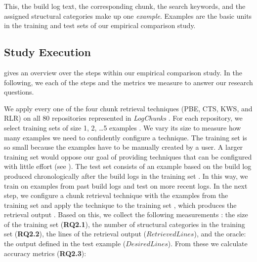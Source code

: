 This, the build log text, the corresponding chunk,
the search keywords, and the assigned structural categories
make up one \emph{example}.
Examples are the basic units in the training and test sets of our
empirical comparison study.

\subsection{Study Execution}
 gives an overview over the steps within our empirical
comparison study.
In the following, we each of the steps and the metrics
we measure to answer our research questions.

We apply every one of the four chunk retrieval techniques
(PBE, CTS, KWS, and RLR) on all 80 repositories represented in
\emph{LogChunks} .
For each repository, we select training sets of size 1, 2, \dots 5
examples .
We vary its size to measure how many examples we need to
confidently configure a technique.
The training set is so small because the examples have to be
manually created by a user.
A larger training set would oppose our goal of providing techniques
that can be configured with little effort
(see ).
The test set consists of an example based on the build log produced
chronologically after the build logs in the training set .
In this way, we train on examples from past build logs and test on
more recent logs.
In the next step, we configure a chunk retrieval technique with
the examples from the training set  and apply the technique
to the
training set , which produces the retrieval output
.
Based on this, we collect the following measurements :
the size of the training set (\textbf{RQ2.1}),
the number of structural categories in the training
set (\textbf{RQ2.2}),
the lines of the retrieval output ($\mathit{RetrievedLines}$),
and the oracle: the output defined in the test example
($\mathit{DesiredLines}$).
From these we calculate accuracy metrics (\textbf{RQ2.3}):

